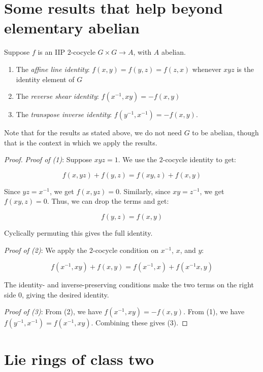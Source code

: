 \documentclass[10pt]{amsart}
\begin{document}
\section{Some results that help beyond elementary abelian}

\begin{lemma}
  Suppose $f$ is an IIP $2$-cocycle $G \times G \to A$, with $A$
  abelian.

  \begin{enumerate}
  \item The {\em affine line identity}: $f(x,y) = f(y,z) = f(z,x)$
    whenever $xyz$ is the identity element of $G$
  \item The {\em reverse shear identity}: $f(x^{-1},xy) = -f(x,y)$
  \item The {\em transpose inverse identity}: $f(y^{-1},x^{-1}) = -f(x,y)$.
  \end{enumerate}
\end{lemma}

Note that for the results as stated above, we do not need $G$ to be
abelian, though that is the context in which we apply the results.

\begin{proof}
  {\em Proof of (1)}: Suppose $xyz = 1$. We use the $2$-cocycle
  identity to get:

  $$f(x,yz) + f(y,z) = f(xy,z) +  f(x,y)$$

  Since $yz = x^{-1}$, we get $f(x,yz) = 0$. Similarly, since $xy
  = z^{-1}$, we get $f(xy,z) = 0$. Thus, we can drop the terms and get:

  $$f(y,z) = f(x,y)$$

  Cyclically permuting this gives the full identity.

  {\em Proof of (2)}: We apply the $2$-cocycle condition on $x^{-1}$,
  $x$, and $y$:

  $$f(x^{-1},xy) + f(x,y) = f(x^{-1},x) + f(x^{-1}x,y)$$

  The identity- and inverse-preserving conditions make the two terms
  on the right side $0$, giving the desired identity.

  {\em Proof of (3)}: From (2), we have $f(x^{-1},xy) = -f(x,y)$. From
  (1), we have $f(y^{-1},x^{-1}) = f(x^{-1},xy)$. Combining these
  gives (3).
\end{proof}

\section{Lie rings of class two}
\end{document}
